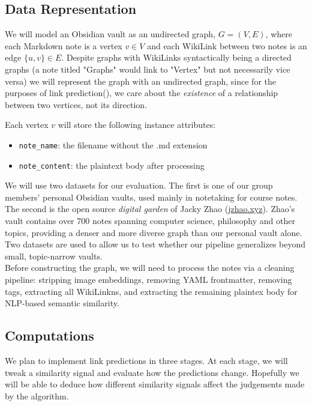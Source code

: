 \documentclass[fontsize=11pt]{article}
\begin{document}
\subsection*{Data Representation}
We will model an Obsidian vault as an undirected graph, $G = (V, E)$, where each Markdown note is a vertex $v \in V$ and each WikiLink between two notes is an edge $\{u, v\} \in E$. Despite graphs with WikiLinks syntactically being a directed graphs (a note titled "Graphs" would link to "Vertex" but not necessarily vice versa) we will represent the graph with an undirected graph, since for the purposes of link prediction(\cite {gfg_linkprediction}), we care about the \textit{existence} of a relationship between two vertices, not its direction.

\noindent Each vertex $v$ will store the following instance attributes:
\begin{itemize}
    \item \texttt{note\_name}: the filename without the .md extension
    \item \texttt{note\_content}: the plaintext body after processing
\end{itemize}


\noindent We will use two datasets for our evaluation. The first is one of our group members' personal Obsidian vaults, used mainly in notetaking for course notes. The second is the open source \textit{digital garden} of Jacky Zhao (\url{jzhao.xyz}). Zhao's vault contains over 700 notes spanning computer science, philosophy and other topics, providing a denser and more diverse graph than our personal vault alone. Two datasets are used to allow us to test whether our pipeline generalizes beyond small, topic-narrow vaults.\\

\noindent Before constructing the graph, we will need to process the notes via a cleaning pipeline: stripping image embeddings, removing YAML frontmatter, removing tags, extracting all WikiLinkns, and extracting the remaining plaintex body for NLP-based semantic similarity.

\subsection*{Computations}
We plan to implement link predictions in three stages. At each stage, we will tweak a similarity signal and evaluate how the predictions change. Hopefully we will be able to deduce how different similarity signals affect the judgements made by the algorithm. 
\end{document}
